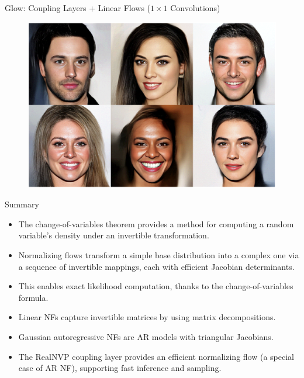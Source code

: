 \documentclass{beamer}
\begin{document}
\begin{frame}{Glow: Coupling Layers + Linear Flows ($1 \times 1$ Convolutions)}
	\begin{figure}
		\centering
		\includegraphics[width=0.9\linewidth]{figs/glow_faces.png}
	\end{figure}
\end{frame}
\begin{frame}{Summary}
	\begin{itemize}
		\item The change-of-variables theorem provides a method for computing a random variable's density under an invertible transformation.
		\vfill
		\item Normalizing flows transform a simple base distribution into a complex one via a sequence of invertible mappings, each with efficient Jacobian determinants.
		\vfill
		\item This enables exact likelihood computation, thanks to the change-of-variables formula.
		\vfill
		\item Linear NFs capture invertible matrices by using matrix decompositions.
		\vfill
		\item Gaussian autoregressive NFs are AR models with triangular Jacobians.
		\vfill
		\item The RealNVP coupling layer provides an efficient normalizing flow (a special case of AR NF), supporting fast inference and sampling.
	\end{itemize}
\end{frame}
\end{document}
